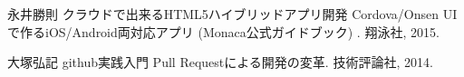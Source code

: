 
\begin{thebibliography}{2}
永井勝則
\newblock クラウドで出来るHTML5ハイブリッドアプリ開発 Cordova/Onsen UIで作るiOS/Android両対応アプリ (Monaca公式ガイドブック) .
\newblock 翔泳社, 2015.

大塚弘記
\newblock github実践入門 Pull Requestによる開発の変革.
\newblock 技術評論社, 2014.

\end{thebibliography}
